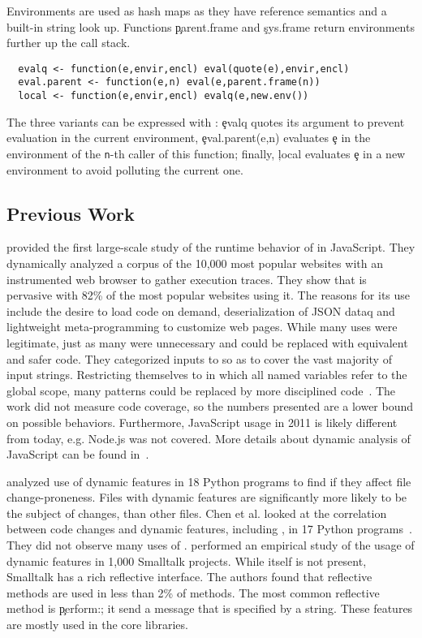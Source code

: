 \documentclass[review,screen,acmsmall,anonymous=true]{acmart}
\begin{document}
\noindent Environments are used as hash maps as they have reference semantics
and a built-in string look up. Functions \c{parent.frame} and \c{sys.frame}
return environments further up the call stack.
 \begin{lstlisting}
  evalq <- function(e,envir,encl) eval(quote(e),envir,encl)
  eval.parent <- function(e,n) eval(e,parent.frame(n))
  local <- function(e,envir,encl) evalq(e,new.env())
\end{lstlisting}
The three variants can be expressed with \eval: \c{evalq} quotes its
argument to prevent evaluation in the current environment,
\c{eval.parent(e,n)} evaluates \c{e} in the environment of the {\tt n}-th
caller of this function; finally, \c{local} evaluates \c{e} in a new environment
to avoid polluting the current one.

\subsection{Previous Work}

\citet{ecoop11} provided the first large-scale study of the runtime behavior of
\eval in JavaScript. They dynamically analyzed a corpus of the 10,000 most
popular websites with an instrumented web browser to gather execution traces.
They show that \eval is pervasive with 82\% of the most popular websites using
it. The reasons for its use include the desire to load code on demand,
deserialization of JSON dataq and lightweight meta-programming to customize web
pages. While many uses were legitimate, just as many were unnecessary and could
be replaced with equivalent and safer code. They categorized inputs to \eval so
as to cover the vast majority of input strings. Restricting themselves to \eval
in which all named variables refer to the global scope, many patterns could be
replaced by more disciplined code~\cite{oopsla12b, moller12}. The work did not
measure code coverage, so the numbers presented are a lower bound on possible
behaviors. Furthermore, JavaScript usage in 2011 is likely different from today,
e.g. Node.js was not covered. More details about dynamic analysis of JavaScript
can be found in~\cite{liang}.

\citet{wang} analyzed use of dynamic features in 18 Python programs to find if
they affect file change-proneness. Files with dynamic features are significantly
more likely to be the subject of changes, than other files. Chen et al. looked
at the correlation between code changes and dynamic features, including \eval,
in 17 Python programs~\cite{chen}. They did not observe many uses of \eval.
\citet{oscar} performed an empirical study of the usage of dynamic features in
1,000 Smalltalk projects. While \eval itself is not present, Smalltalk has a
rich reflective interface. The authors found that reflective methods are used in less
than 2\% of methods. The most common reflective method is \c{perform:}; it send
a message that is specified by a string. These features are mostly used in the
core libraries.
\end{document}
